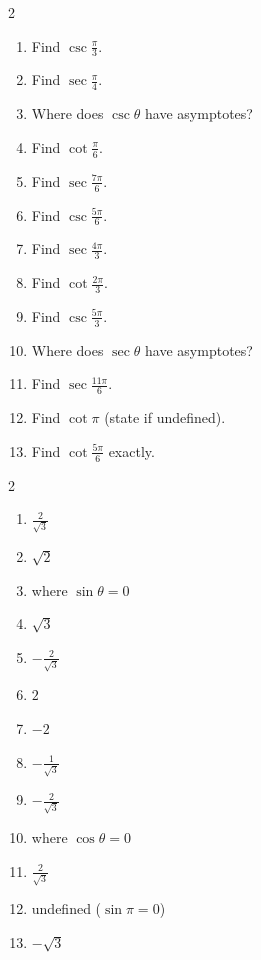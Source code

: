 \documentclass[11pt]{article}
\begin{document}
\begin{recapbox}
\begin{multicols}{2}
\small
\begin{enumerate}[leftmargin=*,itemsep=3pt]
  \item Find $\csc\tfrac{\pi}{3}$.
  \item Find $\sec\tfrac{\pi}{4}$.
  \item Where does $\csc\theta$ have asymptotes?
  \item Find $\cot\tfrac{\pi}{6}$.
  \item Find $\sec\tfrac{7\pi}{6}$.
  \item Find $\csc\tfrac{5\pi}{6}$.
  \item Find $\sec\tfrac{4\pi}{3}$.
  \item Find $\cot\tfrac{2\pi}{3}$.
  \item Find $\csc\tfrac{5\pi}{3}$.
  \item Where does $\sec\theta$ have asymptotes?
  \item Find $\sec\tfrac{11\pi}{6}$.
  \item Find $\cot\pi$ (state if undefined).
  \item Find $\cot\tfrac{5\pi}{6}$ exactly.
\end{enumerate}
\end{multicols}
\end{recapbox}

\begin{keybox}
\begin{multicols}{2}
\small
\begin{enumerate}[leftmargin=*,itemsep=3pt]
  \item $\tfrac{2}{\sqrt3}$
  \item $\sqrt2$
  \item where $\sin\theta=0$
  \item $\sqrt3$
  \item $-\tfrac{2}{\sqrt3}$
  \item $2$
  \item $-2$
  \item $-\tfrac{1}{\sqrt3}$
  \item $-\tfrac{2}{\sqrt3}$
  \item where $\cos\theta=0$
  \item $\tfrac{2}{\sqrt3}$
  \item undefined ($\sin\pi=0$)
  \item $-\sqrt3$
\end{enumerate}
\end{multicols}
\end{keybox}
\end{document}
